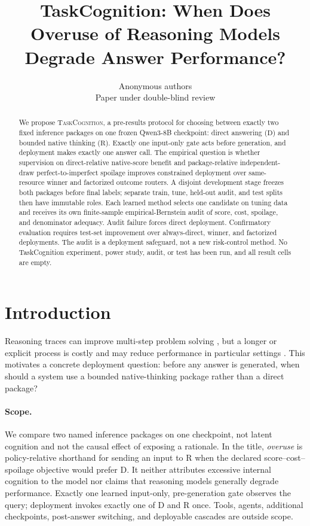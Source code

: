 \documentclass{article}
\title{TaskCognition: When Does Overuse of Reasoning Models Degrade Answer Performance?}
\author{Anonymous authors\\Paper under double-blind review}
\newcommand{\TC}{\textsc{TaskCognition}}
\newcommand{\D}{\ensuremath{\mathrm{D}}}
\newcommand{\Rpol}{\ensuremath{\mathrm{R}}}
\newcommand{\1}{\mathbb{I}}
\begin{document}
\maketitle

\begin{abstract}
We propose \TC{}, a pre-results protocol for choosing between exactly two fixed inference packages on one frozen Qwen3-8B checkpoint: direct answering (\D) and bounded native thinking (\Rpol). Exactly one input-only gate acts before generation, and deployment makes exactly one answer call. The empirical question is whether supervision on direct-relative native-score benefit and package-relative independent-draw perfect-to-imperfect spoilage improves constrained deployment over same-resource winner and factorized outcome routers. A disjoint development stage freezes both packages before final labels; separate train, tune, held-out audit, and test splits then have immutable roles. Each learned method selects one candidate on tuning data and receives its own finite-sample empirical-Bernstein audit of score, cost, spoilage, and denominator adequacy. Audit failure forces direct deployment. Confirmatory evaluation requires test-set improvement over always-direct, winner, and factorized deployments. The audit is a deployment safeguard, not a new risk-control method. No TaskCognition experiment, power study, audit, or test has been run, and all result cells are empty.
\end{abstract}

\section{Introduction}
Reasoning traces can improve multi-step problem solving \citep{wei2022chain}, but a longer or explicit process is costly and may reduce performance in particular settings \citep{pmlr-v267-liu25t,wu2026more,srivastava-etal-2026-llms}. This motivates a concrete deployment question: before any answer is generated, when should a system use a bounded native-thinking package rather than a direct package?

\paragraph{Scope.}
We compare two named inference packages on one checkpoint, not latent cognition and not the causal effect of exposing a rationale. In the title, \emph{overuse} is policy-relative shorthand for sending an input to \Rpol{} when the declared score--cost--spoilage objective would prefer \D. It neither attributes excessive internal cognition to the model nor claims that reasoning models generally degrade performance. Exactly one learned input-only, pre-generation gate observes the query; deployment invokes exactly one of \D{} and \Rpol{} once. Tools, agents, additional checkpoints, post-answer switching, and deployable cascades are outside scope.
\end{document}

